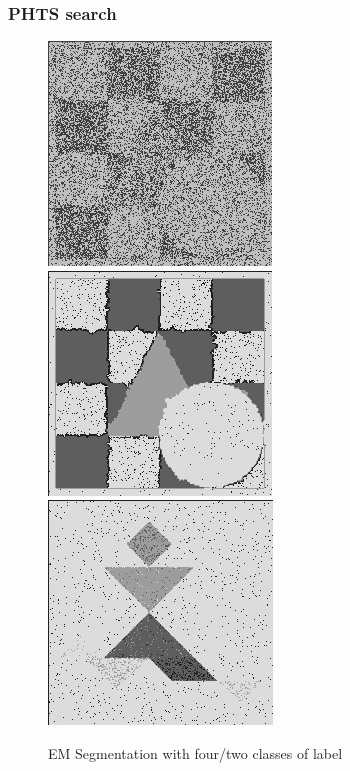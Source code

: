 \documentclass{beamer}
\begin{document}
\begin{frame}
\frametitle{PHTS search}
\begin{figure}\label{fg:1}
\begin{center}
\includegraphics[width=.25\linewidth]{chess_circle_triangle_2_14.jpg}
\includegraphics[width=.25\linewidth]{chess_circle_triangle_10.jpg}
\\[\baselineskip]%
\includegraphics[width=.25\linewidth]{tangram_10.jpg}
\\[\baselineskip]%
\caption{EM Segmentation with four/two classes of label}
\end{center}
\end{figure}
\end{frame}
\end{document}
